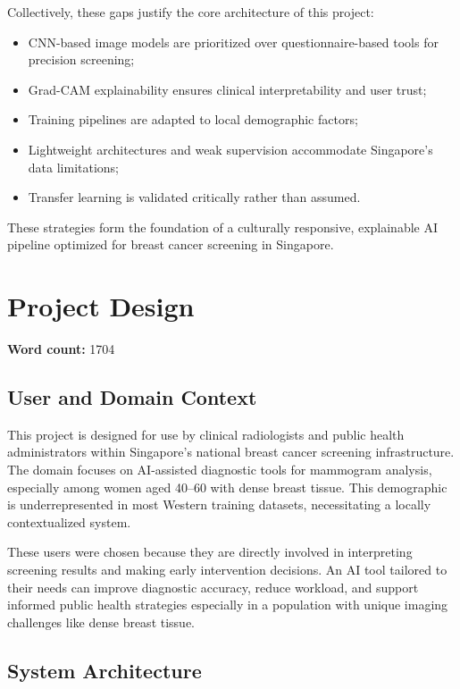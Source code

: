 \documentclass[12pt]{article}
\begin{document}
\vspace{0.5em}
Collectively, these gaps justify the core architecture of this project:
\begin{itemize}
    \item CNN-based image models are prioritized over questionnaire-based tools for precision screening;
    \item Grad-CAM explainability ensures clinical interpretability and user trust;
    \item Training pipelines are adapted to local demographic factors;
    \item Lightweight architectures and weak supervision accommodate Singapore's data limitations;
    \item Transfer learning is validated critically rather than assumed.
\end{itemize}

These strategies form the foundation of a culturally responsive, explainable AI pipeline optimized for breast cancer screening in Singapore.


\newpage
\section{Project Design}
\noindent\textbf{Word count:} 1704
\vspace{1em}

\subsection{User and Domain Context}
This project is designed for use by clinical radiologists and public health administrators within Singapore’s national breast cancer screening infrastructure. The domain focuses on AI-assisted diagnostic tools for mammogram analysis, especially among women aged 40–60 with dense breast tissue. This demographic is underrepresented in most Western training datasets, necessitating a locally contextualized system.

These users were chosen because they are directly involved in interpreting screening results and making early intervention decisions. An AI tool tailored to their needs can improve diagnostic accuracy, reduce workload, and support informed public health strategies especially in a population with unique imaging challenges like dense breast tissue.

\subsection{System Architecture}
\end{document}
